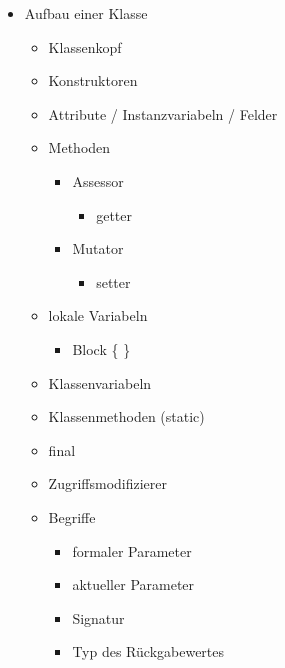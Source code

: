 \begin{itemize}
    \item Aufbau einer Klasse
    \begin{itemize}
        \item Klassenkopf
        \item Konstruktoren
        \item Attribute / Instanzvariabeln / Felder
        \item Methoden
        \begin{itemize}
            \item Assessor
            \begin{itemize}
                \item getter
            \end{itemize}
            \item Mutator
            \begin{itemize}
                \item setter
            \end{itemize}
        \end{itemize}
        \item lokale Variabeln
        \begin{itemize}
            \item Block \{ \}
        \end{itemize}
        \item Klassenvariabeln
        \item Klassenmethoden (static)
        \item final
        \item Zugriffsmodifizierer
        \item Begriffe
        \begin{itemize}
            \item formaler Parameter
            \item aktueller Parameter
            \item Signatur
            \item Typ des  Rückgabewertes
        \end{itemize}
    \end{itemize}
\end{itemize}
